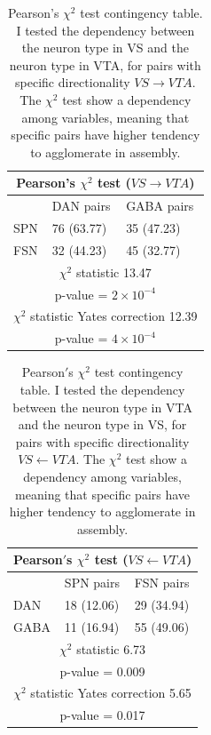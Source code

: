 \begin{table}[H]
\begin{tabular}{ |p{3cm}|p{3cm}|p{3cm}| }
 \hline
 \multicolumn{3}{|c|}{Pearson's $\chi^2$ test ($VS \rightarrow VTA$)} \\
 \hline
 & DAN pairs & GABA pairs\\
 \hline
 SPN & 76 (63.77) & 35 (47.23) \\
 \hline
 FSN & 32 (44.23) & 45 (32.77)\\
 \hline
 \multicolumn{3}{|c|}{$\chi^2$ statistic  13.47}\\
 \multicolumn{3}{|c|}{p-value = $2\times10^{-4}$}\\
 \hline
 \multicolumn{3}{|c|}{$\chi^2$ statistic Yates correction 12.39}\\
 \multicolumn{3}{|c|}{p-value = $4\times10^{-4}$}\\
 \hline
\end{tabular}
\caption{Pearson's $\chi^{2}$ test contingency table. I tested the dependency between the neuron type in VS and the neuron type in VTA, for pairs with specific directionality $VS \rightarrow VTA$. The $\chi^2$ test show a dependency among variables, meaning that specific pairs have higher tendency to agglomerate in assembly.}
\label{tab:chisquare_vsvta}
\end{table}
\begin{table}[H]
\begin{tabular}{ |p{3cm}|p{3cm}|p{3cm}| }
 \hline
 \multicolumn{3}{|c|}{Pearson$'$s $\chi^2$ test ($VS \leftarrow VTA$)} \\
 \hline
 & SPN pairs & FSN pairs\\
 \hline
 DAN & 18 (12.06) & 29 (34.94) \\
 \hline
 GABA & 11 (16.94) & 55 (49.06)\\
 \hline
 \multicolumn{3}{|c|}{$\chi^2$ statistic  6.73}\\
 \multicolumn{3}{|c|}{p-value = 0.009}\\
 \hline
 \multicolumn{3}{|c|}{$\chi^2$ statistic Yates correction 5.65}\\
 \multicolumn{3}{|c|}{p-value = 0.017}\\
 \hline
\end{tabular}
\caption{Pearson$'$s $\chi^{2}$ test contingency table. I tested the dependency between the neuron type in VTA and the neuron type in VS, for pairs with specific directionality $VS \leftarrow VTA$. The $\chi^2$ test show a dependency among variables, meaning that specific pairs have higher tendency to agglomerate in assembly.}
\label{tab:chisquare_vtavs}
\end{table}
